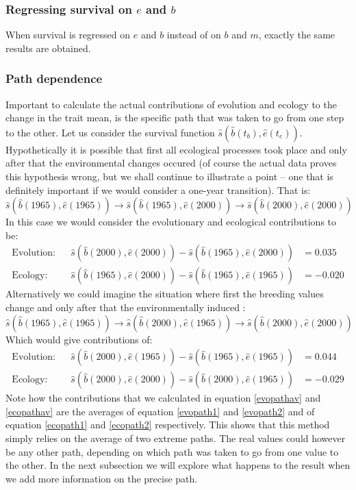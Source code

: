 \subsubsection{Regressing survival on $e$ and $b$}
When survival is regressed on $e$ and $b$ instead of on $b$ and $m$, exactly the same results are obtained.
\subsubsection{Path dependence}
Important to calculate the actual contributions of evolution and ecology to the change in the trait mean, is the specific path that was taken to go from one step to the other. Let us consider the survival function $\hat{s}(\hat{b}(t_b),\hat{e}(t_e))$. Hypothetically it is possible that first all ecological processes took place and only after that the environmental changes occured (of course the actual data proves this hypothesis wrong, but we shall continue to illustrate a point -- one that is definitely important if we would consider a one-year transition). That is:
\begin{equation}
\hat{s}(\hat{b}(1965),\hat{e}(1965)) \rightarrow \hat{s}(\hat{b}(1965),\hat{e}(2000)) \rightarrow \hat{s}(\hat{b}(2000),\hat{e}(2000))
\end{equation}
In this case we would consider the evolutionary and ecological contributions to be:
\begin{align}
\text{Evolution:} & & \hat{s}(\hat{b}(2000),\hat{e}(2000))-\hat{s}(\hat{b}(1965),\hat{e}(2000)) &= 0.035 \label{evopath1}\\ 
\text{Ecology:} & & \hat{s}(\hat{b}(1965),\hat{e}(2000))-\hat{s}(\hat{b}(1965),\hat{e}(1965)) &= -0.020 \label{ecopath1}
\end{align}
Alternatively we could imagine the situation where first the breeding values change and only after that the environmentally induced :
  \begin{equation}
\hat{s}(\hat{b}(1965),\hat{e}(1965)) \rightarrow \hat{s}(\hat{b}(2000),\hat{e}(1965)) \rightarrow \hat{s}(\hat{b}(2000),\hat{e}(2000))
\end{equation}
Which would give contributions of: 
  \begin{align}
\text{Evolution:} & & \hat{s}(\hat{b}(2000),\hat{e}(1965))-\hat{s}(\hat{b}(1965),\hat{e}(1965)) &= 0.044\label{evopath2}\\
\text{Ecology:} & & \hat{s}(\hat{b}(2000),\hat{e}(2000))-\hat{s}(\hat{b}(2000),\hat{e}(1965)) &= -0.029\label{ecopath2}
\end{align}
Note how the contributions that we calculated in equation \ref{evopathav} and \ref{ecopathav} are the averages of equation \ref{evopath1} and \ref{evopath2} and of equation \ref{ecopath1} and \ref{ecopath2} respectively. This shows that this method simply relies on the average of two extreme paths. The real values could however be any other path, depending on which path was taken to go from one value to the other. In the next subsection we will explore what happens to the result when we add more information on the precise path.

